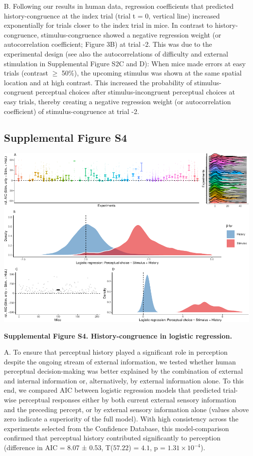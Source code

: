 \documentclass[
]{article}
\begin{document}
B. Following our results in human data, regression coefficients that
predicted history-congruence at the index trial (trial t = 0, vertical
line) increased exponentially for trials closer to the index trial in
mice. In contrast to history-congruence, stimulus-congruence showed a
negative regression weight (or autocorrelation coefficient; Figure 3B)
at trial -2. This was due to the experimental design (see also the
autocorrelations of difficulty and external stimulation in Supplemental
Figure S2C and D): When mice made errors at easy trials (contrast
\(\geq\) 50\%), the upcoming stimulus was shown at the same spatial
location and at high contrast. This increased the probability of
stimulus-congruent perceptual choices after stimulus-incongruent
perceptual choices at easy trials, thereby creating a negative
regression weight (or autocorrelation coefficient) of
stimulus-congruence at trial -2.

\newpage

\hypertarget{supplemental-figure-s4}{%
\subsection{Supplemental Figure S4}\label{supplemental-figure-s4}}

\includegraphics{modes_mouse_rev2_files/figure-latex/Supplemental_Figure_S4-1.pdf}

\textbf{Supplemental Figure S4. History-congruence in logistic
regression.}

A. To ensure that perceptual history played a significant role in
perception despite the ongoing stream of external information, we tested
whether human perceptual decision-making was better explained by the
combination of external and internal information or, alternatively, by
external information alone. To this end, we compared AIC between
logistic regression models that predicted trial-wise perceptual
responses either by both current external sensory information and the
preceding percept, or by external sensory information alone (values
above zero indicate a superiority of the full model). With high
consistency across the experiments selected from the Confidence
Database, this model-comparison confirmed that perceptual history
contributed significantly to perception (difference in AIC = 8.07 ±
0.53, T(\(57.22\)) = \(4.1\), p = \(\ensuremath{1.31\times 10^{-4}}\)).
\end{document}
